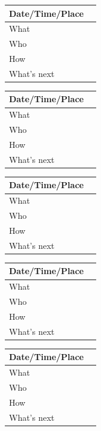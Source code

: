 \documentclass{article}
\begin{document}
\begin{table}[H]
\begin{tabular}{|p{1.5in}|p{4in}|}
\hline
Date/Time/Place &  \\ \hline
What            &  \\ \hline
Who             &  \\ \hline
How             &  \\ \hline
What's next     &  \\ \hline
\end{tabular}
\end{table}

\begin{table}[H]
\begin{tabular}{|p{1.5in}|p{4in}|}
\hline
Date/Time/Place &  \\ \hline
What            &  \\ \hline
Who             &  \\ \hline
How             &  \\ \hline
What's next     &  \\ \hline
\end{tabular}
\end{table}

\begin{table}[H]
\begin{tabular}{|p{1.5in}|p{4in}|}
\hline
Date/Time/Place &  \\ \hline
What            &  \\ \hline
Who             &  \\ \hline
How             &  \\ \hline
What's next     &  \\ \hline
\end{tabular}
\end{table}

\begin{table}[H]
\begin{tabular}{|p{1.5in}|p{4in}|}
\hline
Date/Time/Place &  \\ \hline
What            &  \\ \hline
Who             &  \\ \hline
How             &  \\ \hline
What's next     &  \\ \hline
\end{tabular}
\end{table}

\begin{table}[H]
\begin{tabular}{|p{1.5in}|p{4in}|}
\hline
Date/Time/Place &  \\ \hline
What            &  \\ \hline
Who             &  \\ \hline
How             &  \\ \hline
What's next     &  \\ \hline
\end{tabular}
\end{table}
\end{document}
